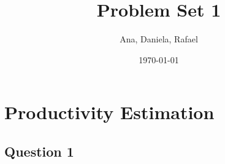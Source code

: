 \documentclass[11pt]{article}
\title{Problem Set 1}
\author{Ana, Daniela, Rafael}
\date{\today}
\begin{document}
\maketitle

\section*{Productivity Estimation}

\subsection*{Question 1}

\end{document}
